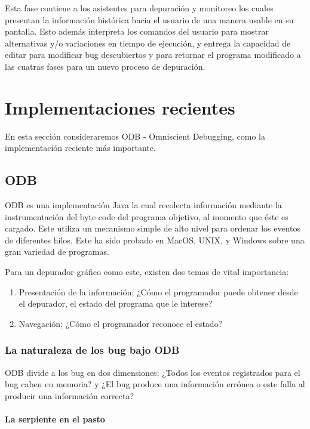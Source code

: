 \documentclass[12pt,legalpaper]{report}
\begin{document}
Esta fase contiene a los asistentes para depuración y monitoreo los cuales presentan la información histórica hacia el usuario de una manera usable en su pantalla.  Esto además interpreta los comandos del usuario para mostrar alternativas y/o variaciones en tiempo de ejecución, y entrega la capacidad de editar para modificar bug descubiertos y para retornar el programa modificado a las cuatras fases para un nuevo proceso de depuración.


	\section{Implementaciones recientes}

En esta sección consideraremos ODB - Omniscient Debugging, como la implementación reciente más importante.

		\subsection{ODB}

ODB es una implementación Java la cual recolecta información mediante la instrumentación del byte code del programa objetivo, al momento que éste es cargado.  Este utiliza un mecanismo simple de alto nivel para ordenar los eventos de diferentes hilos.  Este ha sido probado en MacOS, UNIX, y Windows sobre una gran variedad de programas.

Para un depurador gráfico como este, existen dos temas de vital importancia:
\begin{enumerate}
	\item Presentación de la información; ¿Cómo el programador puede obtener desde el depurador, el estado del programa que le interese?
	\item Navegación; ¿Cómo el programador reconoce el estado?
\end{enumerate} 

			\subsubsection{La naturaleza de los bug bajo ODB}

ODB divide a los bug en dos dimensiones:  ¿Todos los eventos registrados para el bug caben en memoria? y ¿El bug produce una información errónea o este falla al producir una información correcta?

				\paragraph{La serpiente en el pasto}
\end{document}

